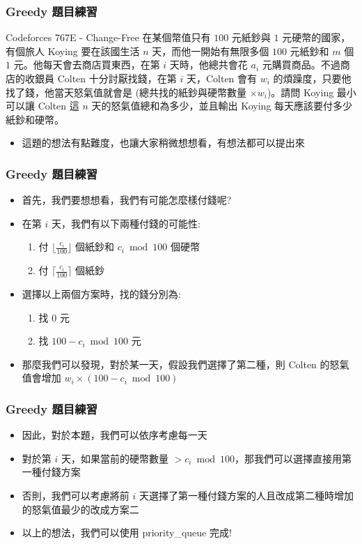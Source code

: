 \documentclass[aspectratio=169]{beamer}
\begin{document}
\begin{frame}
\frametitle{Greedy 題目練習}
    \begin{block}{Codeforces 767E - Change-Free}
        在某個幣值只有 $100$ 元紙鈔與 $1$ 元硬幣的國家，有個旅人 Koying 要在該國生活 $n$ 天，而他一開始有無限多個 $100$ 元紙鈔和 $m$ 個 $1$ 元。他每天會去商店買東西，在第 $i$ 天時，他總共會花 $a_i$ 元購買商品。不過商店的收銀員 Colten 十分討厭找錢，在第 $i$ 天，Colten 會有 $w_i$ 的煩躁度，只要他找了錢，他當天怒氣值就會是 (總共找的紙鈔與硬幣數量 $\times w_i$)。請問 Koying 最小可以讓 Colten 這 $n$ 天的怒氣值總和為多少，並且輸出 Koying 每天應該要付多少紙鈔和硬幣。
    \end{block}
    \begin{itemize}
        \item<1-> 這題的想法有點難度，也讓大家稍微想想看，有想法都可以提出來
    \end{itemize}
\end{frame}

\begin{frame}
\frametitle{Greedy 題目練習}
    \begin{itemize}
        \item<1-> 首先，我們要想想看，我們有可能怎麼樣付錢呢?
        \item<2-> 在第 $i$ 天，我們有以下兩種付錢的可能性:
            \begin{enumerate}
                \item 付 $\lfloor \frac{c_i}{100} \rfloor$ 個紙鈔和 $c_i \bmod 100$ 個硬幣
                \item 付 $\lceil \frac{c_i}{100} \rceil$ 個紙鈔
            \end{enumerate}
        \item<3-> 選擇以上兩個方案時，找的錢分別為: 
            \begin{enumerate}
                \item 找 $0$ 元
                \item 找 $100 - c_i \bmod 100$ 元
            \end{enumerate}
        \item<4-> 那麼我們可以發現，對於某一天，假設我們選擇了第二種，則 Colten 的怒氣值會增加 $w_i \times (100 - c_i \bmod 100)$
    \end{itemize}
\end{frame}

\begin{frame}
\frametitle{Greedy 題目練習}
    \begin{itemize}
        \item<1-> 因此，對於本題，我們可以依序考慮每一天
        \item<2-> 對於第 $i$ 天，如果當前的硬幣數量 $> c_i \bmod 100$，那我們可以選擇直接用第一種付錢方案
        \item<2-> 否則，我們可以考慮將前 $i$ 天選擇了第一種付錢方案的人且改成第二種時增加的怒氣值最少的改成方案二
        \item<3-> 以上的想法，我們可以使用 priority\_queue 完成!
    \end{itemize}
\end{frame}
\end{document}
